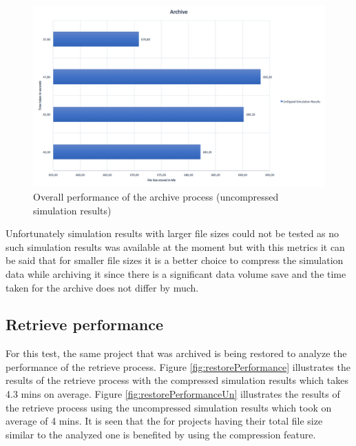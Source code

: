 \begin{figure}[H]
    \centering \includegraphics[scale=0.5]{grafiken/archiveUnzip.png}
    \caption{Overall performance of the archive process (uncompressed simulation results)}
    \label{fig:archivePerformanceUn}
\end{figure}

Unfortunately simulation results with larger file sizes could not be tested as no such simulation results was available at the moment but with this metrics it can be said that
for smaller file sizes it is a better choice to compress the simulation data while archiving it since there is a significant data volume save and the time taken for the
archive does not differ by much.   

\subsection{Retrieve performance}
For this test, the same project that was archived is being restored to analyze the performance of the retrieve process. Figure \ref{fig:restorePerformance} illustrates
the results of the retrieve process with the compressed simulation results which takes 4.3 mins on average. Figure \ref{fig:restorePerformanceUn} illustrates the
results of the retrieve process using the uncompressed simulation results which took on average of 4 mins. It is seen that the for projects having their total file
size similar to the analyzed one is benefited by using the compression feature.

